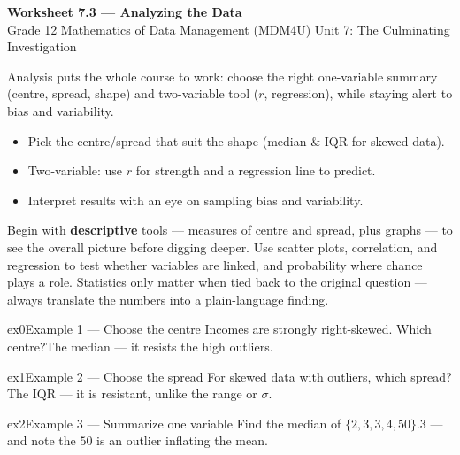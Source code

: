 \documentclass[11pt]{article}
\begin{document}
\begin{center}
{\LARGE\bfseries\color{titleblue}Worksheet 7.3 --- Analyzing the Data}\\[2pt]
{\small Grade 12 Mathematics of Data Management (MDM4U) \textperiodcentered{} Unit 7: The Culminating Investigation}
\end{center}

\begin{ideabox}
Analysis puts the whole course to work: choose the right one-variable summary (centre, spread, shape) and two-variable tool ($r$, regression), while staying alert to bias and variability.
\begin{itemize}[leftmargin=*,itemsep=2pt]
  \item Pick the centre/spread that suit the shape (median \& IQR for skewed data).
  \item Two-variable: use $r$ for strength and a regression line to predict.
  \item Interpret results with an eye on sampling bias and variability.
\end{itemize}
\end{ideabox}

\begin{learnbox}
Begin with \textbf{descriptive} tools — measures of centre and spread, plus graphs — to see the overall picture before digging deeper.
Use scatter plots, correlation, and regression to test whether variables are linked, and probability where chance plays a role.
Statistics only matter when tied back to the original question — always translate the numbers into a plain-language finding.
\end{learnbox}


\begin{example}{ex0}{Example 1 --- Choose the centre}
Incomes are strongly right-skewed. Which centre?\soln The median --- it resists the high outliers.
\end{example}

\begin{example}{ex1}{Example 2 --- Choose the spread}
For skewed data with outliers, which spread?\soln The IQR --- it is resistant, unlike the range or $\sigma$.
\end{example}

\begin{example}{ex2}{Example 3 --- Summarize one variable}
Find the median of $\{2,3,3,4,50\}$.\soln $3$ --- and note the $50$ is an outlier inflating the mean.
\end{example}
\end{document}
